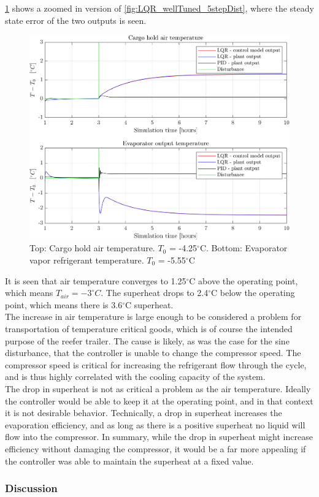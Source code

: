 \cref{fig:LQR_wellTuned_5stepDist_zoom} shows a zoomed in version of \cref{fig:LQR_wellTuned_5stepDist}, where the steady state error of the two outputs is seen.\\

\begin{figure}[h!]
	\centering
	\includegraphics[width=1\textwidth]{Graphics/fig_LQRvsKresten_stepDist_zoom.png}
	\caption{Top: Cargo hold air temperature. $T_0$ = -4.25$^{\circ}$C. Bottom: Evaporator vapor refrigerant temperature. $T_0$ = -5.55$^{\circ}$C}
	\label{fig:LQR_wellTuned_5stepDist_zoom}
\end{figure}

It is seen that air temperature converges to 1.25$^{\circ}$C above the operating point, which means $T_{air} = -3^{\circ}C$. The superheat drops to 2.4$^{\circ}$C below the operating point, which means there is 3.6$^{\circ}$C superheat.\\

The increase in air temperature is large enough to be considered a problem for transportation of temperature critical goods, which is of course the intended purpose of the reefer trailer. The cause is likely, as was the case for the sine disturbance, that the controller is unable to change the compressor speed. The compressor speed is critical for increasing the refrigerant flow through the cycle, and is thus highly correlated with the cooling capacity of the system. \\

The drop in superheat is not as critical a problem as the air temperature. Ideally the controller would be able to keep it at the operating point, and in that context it is not desirable behavior. Technically, a drop in superheat increases the evaporation efficiency, and as long as there is a positive superheat no liquid will flow into the compressor. In summary, while the drop in superheat might increase efficiency without damaging the compressor, it would be a far more appealing if the controller was able to maintain the superheat at a fixed value.


\subsubsection{Discussion}